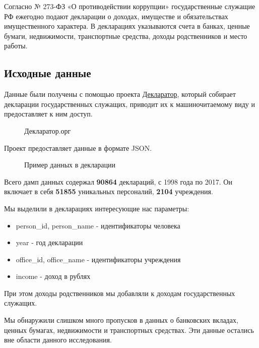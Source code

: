 \documentclass[a4paper,14pt]{article}
\begin{document}
  Согласно № 273-ФЗ «О противодействии коррупции» государственные служащие РФ ежегодно подают декларации о доходах, имуществе и обязательствах имущественного характера. В декларациях указываются счета в банках, ценные бумаги, недвижимости, транспортные средства, доходы родственников и место работы.

  \subsection{Исходные данные}

  Данные были получены с помощью проекта \href{https://declarator.org}{Декларатор}, который собирает декларации государственных служащих, приводит их к машиночитаемому виду и предоставляет к ним доступ.

  \begin{figure}[H]
    \centering
    \caption{Декларатор.орг}
  \end{figure}

  Проект предоставляет данные в формате JSON. 

  \begin{figure}[H]
    \centering
    \caption{Пример данных в декларации}
  \end{figure}

  Всего дамп данных содержал \textbf{90864} деклараций, с 1998 года по 2017.
  Он включает в себя \textbf{51855} уникальных персоналий, \textbf{2104} учреждения.

  Мы выделили в декларациях интересующие нас параметры:
  \begin{itemize}
  \setlength{\itemindent}{.5in}
    \item person\_id, person\_name - идентификаторы человека
    \item year - год декларации
    \item office\_id, office\_name - идентификаторы учреждения
    \item income - доход в рублях
  \end{itemize}

  При этом доходы родственников мы добавляли к доходам государственных служащих.

  Мы обнаружили слишком много пропусков в данных о банковских вкладах, ценных бумагах, недвижимости и транспортных средствах. Эти данные остались вне области данного исследования.
\end{document}
